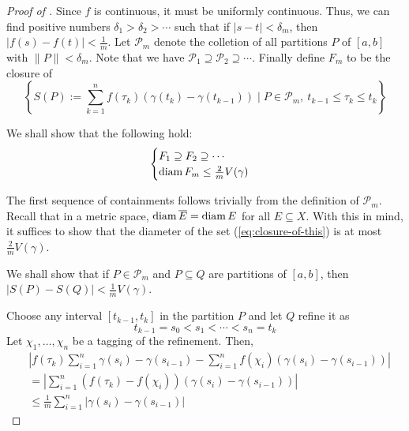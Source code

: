 \begin{proof}[Proof of ]
    Since $f$ is continuous, it must be uniformly continuous. Thus, we can find positive numbers $\delta_1 > \delta_2 > \cdots$ such that if $|s - t| < \delta_m$, then $|f(s) - f(t)| < \frac{1}{m}$. Let $\mathscr P_m$ denote the colletion of all partitions $P$ of $[a,b]$ with $\|P\| < \delta_m$. Note that we have $\mathscr P_1\supseteq\mathscr P_2\supseteq\cdots$. Finally define $F_m$ to be the closure of 
    \begin{equation*}\label{eq:closure-of-this}
        \left\{S(P) := \sum_{k = 1}^n f(\tau_k)(\gamma(t_k) - \gamma(t_{k - 1}))\mid P\in\mathscr P_m,~t_{k - 1}\le\tau_k\le t_k\right\} \tag{$\diamond$}
    \end{equation*}
    
    We shall show that the following hold: 
    \begin{equation*}
        \begin{cases}
            F_1\supseteq F_2\supseteq\cdots\\
            \operatorname{diam} F_m\le\frac{2}{m}V(\gamma)
        \end{cases}
    \end{equation*}

    The first sequence of containments follows trivially from the definition of $\mathscr P_m$. Recall that in a metric space, $\operatorname{diam}\overline{E} = \operatorname{diam} E$ for all $E\subseteq X$. With this in mind, it suffices to show that the diameter of the set (\ref{eq:closure-of-this}) is at most $\frac{2}{m}V(\gamma)$.

    We shall show that if $P\in\mathscr P_m$ and $P\subseteq Q$ are partitions of $[a,b]$, then $|S(P) - S(Q)| < \frac{1}{m}V(\gamma)$.

    Choose any interval $[t_{k - 1}, t_k]$ in the partition $P$ and let $Q$ refine it as 
    \begin{equation*}
        t_{k - 1} = s_0 < s_1 < \cdots < s_n = t_k
    \end{equation*}
    Let $\chi_1,\ldots,\chi_n$ be a tagging of the refinement. Then, 
    \begin{align*}
        &\left|f(\tau_k)\sum_{i = 1}^n\gamma(s_i) - \gamma(s_{i - 1}) - \sum_{i = 1}^n f(\chi_i)(\gamma(s_i) - \gamma(s_{i - 1}))\right|\\
        &= \left|\sum_{i = 1}^n (f(\tau_k) - f(\chi_i))(\gamma(s_i) - \gamma(s_{i - 1}))\right|\\
        &\le\frac{1}{m}\sum_{i = 1}^n|\gamma(s_i) - \gamma(s_{i - 1})|
    \end{align*}


\end{proof}
